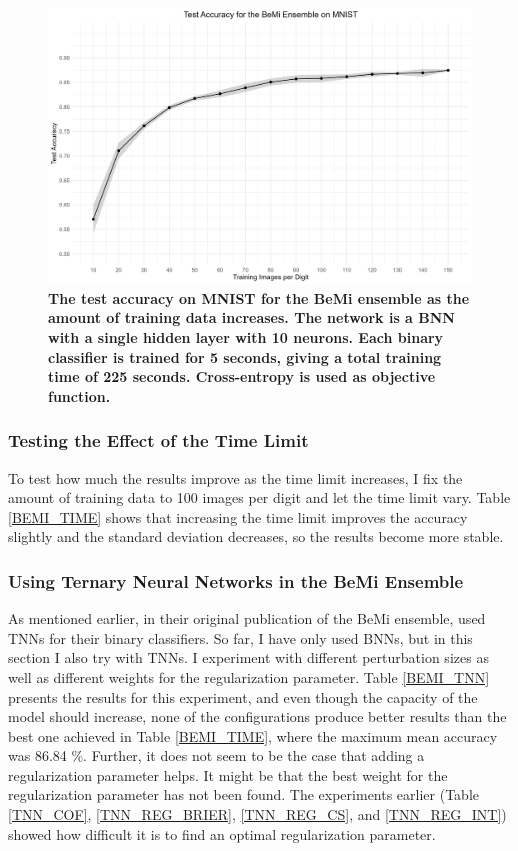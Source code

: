\begin{figure}[H]
    \centering
    \includegraphics[width=1\linewidth]{Figures/BEMI_BS.png}
    \caption{\small{\textbf{The test accuracy on MNIST for the BeMi ensemble as the amount of training data increases. The network is a BNN with a single hidden layer with 10 neurons.
    Each binary classifier is trained for 5 seconds, giving a total training time of 225 seconds. Cross-entropy is used as objective function.}}}
    \label{BEMI_BS}
\end{figure}

\subsubsection{Testing the Effect of the Time Limit}
To test how much the results improve as the time limit increases, I fix the amount of training data to 100 images per digit and let the time limit vary. Table \ref{BEMI_TIME} shows that increasing the time limit improves the accuracy slightly and the standard deviation decreases, so the results become more stable. 



\subsubsection{Using Ternary Neural Networks in the BeMi Ensemble}
As mentioned earlier, in their original publication of the BeMi ensemble, \cite{ambrogio2023} used TNNs for their binary classifiers. So far, I have only used BNNs, but in this section I also try with TNNs. I experiment with different perturbation sizes as well as different weights for the regularization parameter. Table \ref{BEMI_TNN} presents the results for this experiment, and even though the capacity of the model should increase, none of the configurations produce better results than the best one achieved in Table \ref{BEMI_TIME}, where the maximum mean accuracy was 86.84 \%. Further, it does not seem to be the case that adding a regularization parameter helps. It might be that the best weight for the regularization parameter has not been found. The experiments earlier (Table \ref{TNN_COF}, \ref{TNN_REG_BRIER}, \ref{TNN_REG_CS}, and \ref{TNN_REG_INT}) showed how difficult it is to find an optimal regularization parameter. 

